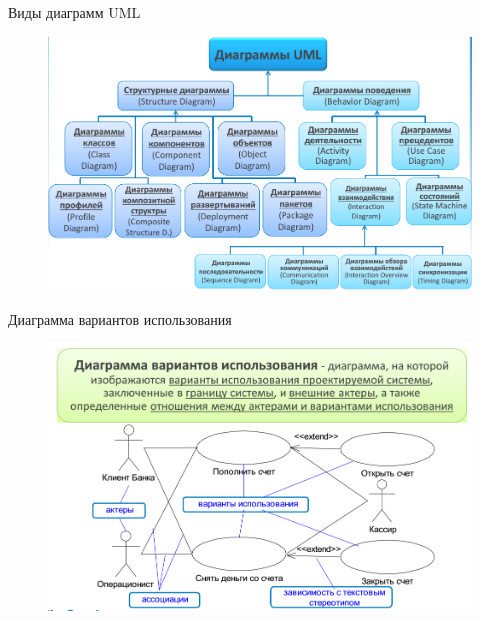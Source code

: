 \documentclass{beamer}
\begin{document}
\begin{frame}[t]{Виды диаграмм UML}
\begin{figure}[h]
\centering
\includegraphics[scale=0.45]{images/lec03-pic06.png}
\end{figure}
\end{frame}

\begin{frame}[t]{Диаграмма вариантов использования}
\begin{figure}[h]
\centering
\includegraphics[scale=0.45]{images/lec03-pic07.png}
\end{figure}
\end{frame}
\end{document}
